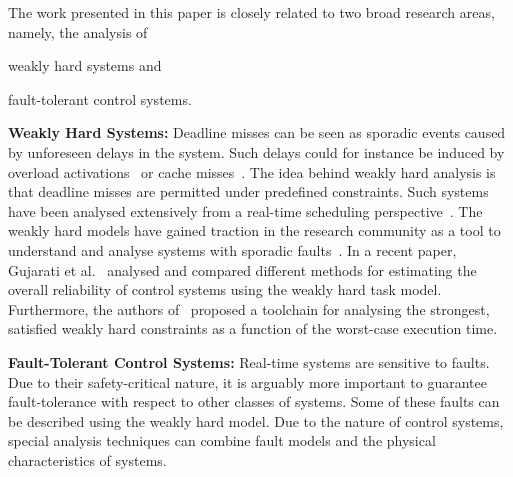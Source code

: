 The work presented in this paper is closely related to two broad research areas, namely, the analysis of 
\begin{enumerate*}[label=(\roman*)]
    \item weakly hard systems and
    \item fault-tolerant control systems.
\end{enumerate*}

\textbf{Weakly Hard Systems:}
Deadline misses can be seen as sporadic events caused by
unforeseen delays in the system. Such delays could for instance
be induced by overload activations~\cite{Xu:2015, Ernst:2014}
or cache misses~\cite{Altmeyer:2014, Davis:2013}. The idea behind
weakly hard analysis is that deadline misses are permitted under
predefined constraints. Such systems have been analysed
extensively from a real-time scheduling
perspective~\cite{Bernat:1997, Caccamo:1997, Choi:2019,
Hammadeh:2019}.  The weakly hard models have gained traction in
the research community as a tool to understand and analyse
systems with sporadic faults~\cite{Soudbakhsh:2013, Bund:2014,
Frehse:2014, Bund:2015, Hammadeh:2017a, Hammadeh:2017b, Sun:2017,
Ahrendts:2018, Soudbakhsh:2018, Pazzaglia:2018,
Gaukler:2019a}. In a recent paper, Gujarati et
al.~\cite{Gujarati:2019} analysed and compared different methods
for estimating the overall reliability of control systems using
the weakly hard task model. Furthermore, the authors
of~\cite{Broman:2019} proposed a toolchain for analysing the
strongest, satisfied weakly hard constraints as a function of the
worst-case execution time.

\textbf{Fault-Tolerant Control Systems:} 
Real-time systems are sensitive to faults. Due to their
safety-critical nature, it is arguably more important
to guarantee fault-tolerance with respect to other
classes of systems. Some of these faults can be
described using the weakly hard model. Due to the
nature of control systems, special analysis techniques
can combine fault models and the physical characteristics of
systems.

